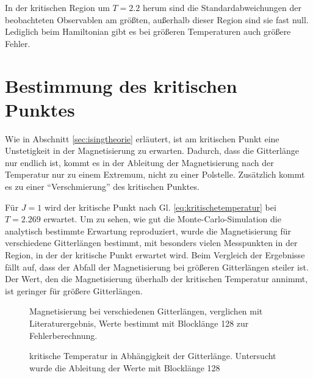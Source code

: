 	In der kritischen Region um $T=\num{2,2}$ herum sind die Standardabweichungen der beobachteten Observablen am größten, außerhalb dieser Region sind sie fast null. Lediglich beim Hamiltonian gibt es bei größeren Temperaturen auch größere Fehler. 
	
	\section{Bestimmung des kritischen Punktes}
	\label{sec:bestkritpunkt}
	
	Wie in Abschnitt \ref{sec:isingtheorie} erläutert, ist am kritischen Punkt eine Unstetigkeit in der Magnetisierung zu erwarten. Dadurch, dass die Gitterlänge nur endlich ist, kommt es in der Ableitung der Magnetisierung nach der Temperatur nur zu einem Extremum, nicht zu einer Polstelle. Zusätzlich kommt es zu einer \enquote{Verschmierung} des kritischen Punktes\cite[vgl. ][S. 104]{binderheermann}.
	
	Für $J=1$ wird der kritische Punkt nach Gl. \ref{eq:kritischetemperatur} bei $T=\num{2,269}$ erwartet.
	Um zu sehen, wie gut die Monte-Carlo-Simulation die analytisch bestimmte Erwartung reproduziert, wurde die Magnetisierung für verschiedene Gitterlängen bestimmt, mit besonders vielen Messpunkten in der Region, in der der kritische Punkt erwartet wird. Beim Vergleich der Ergebnisse fällt auf, dass der Abfall der Magnetisierung bei größeren Gitterlängen steiler ist. Der Wert, den die Magnetisierung überhalb der kritischen Temperatur annimmt, ist geringer für größere Gitterlängen.
	
	\begin{figure}[htbp]
		
		\caption[Magnetisierung bei verschiedenen Gitterlängen]{Magnetisierung bei verschiedenen Gitterlängen, verglichen mit Literaturergebnis, Werte bestimmt mit Blocklänge 128 zur Fehlerberechnung.}
		\label{fig:maglaenge}
	\end{figure}
	
	\begin{figure}[htbp]
		
		\caption[kritische Temperatur in Abhängigkeit der Gitterlänge]{kritische Temperatur in Abhängigkeit der Gitterlänge. Untersucht wurde die Ableitung der Werte mit Blocklänge 128}
		\label{fig:tkritlaenge}
	\end{figure}
	

